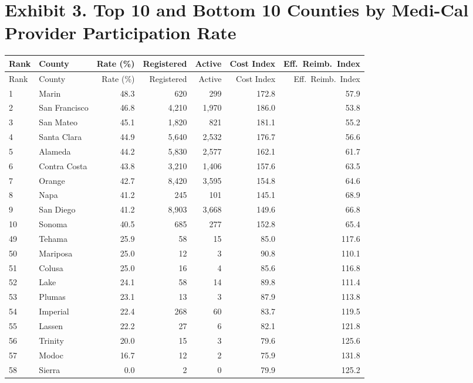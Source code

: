 \documentclass[12pt]{article}
\begin{document}
\newpage
\section*{Exhibit 3. Top 10 and Bottom 10 Counties by Medi-Cal Provider Participation Rate}

\begin{footnotesize}
\begin{longtable}{llrrrrr}
\toprule
Rank & County & Rate (\%) & Registered & Active & Cost Index & Eff.\ Reimb.\ Index \\
\midrule
\endfirsthead
\toprule
Rank & County & Rate (\%) & Registered & Active & Cost Index & Eff.\ Reimb.\ Index \\
\midrule
\endhead
1 & Marin & 48.3 & 620 & 299 & 172.8 & 57.9 \\
2 & San Francisco & 46.8 & 4,210 & 1,970 & 186.0 & 53.8 \\
3 & San Mateo & 45.1 & 1,820 & 821 & 181.1 & 55.2 \\
4 & Santa Clara & 44.9 & 5,640 & 2,532 & 176.7 & 56.6 \\
5 & Alameda & 44.2 & 5,830 & 2,577 & 162.1 & 61.7 \\
6 & Contra Costa & 43.8 & 3,210 & 1,406 & 157.6 & 63.5 \\
7 & Orange & 42.7 & 8,420 & 3,595 & 154.8 & 64.6 \\
8 & Napa & 41.2 & 245 & 101 & 145.1 & 68.9 \\
9 & San Diego & 41.2 & 8,903 & 3,668 & 149.6 & 66.8 \\
10 & Sonoma & 40.5 & 685 & 277 & 152.8 & 65.4 \\
\midrule
49 & Tehama & 25.9 & 58 & 15 & 85.0 & 117.6 \\
50 & Mariposa & 25.0 & 12 & 3 & 90.8 & 110.1 \\
51 & Colusa & 25.0 & 16 & 4 & 85.6 & 116.8 \\
52 & Lake & 24.1 & 58 & 14 & 89.8 & 111.4 \\
53 & Plumas & 23.1 & 13 & 3 & 87.9 & 113.8 \\
54 & Imperial & 22.4 & 268 & 60 & 83.7 & 119.5 \\
55 & Lassen & 22.2 & 27 & 6 & 82.1 & 121.8 \\
56 & Trinity & 20.0 & 15 & 3 & 79.6 & 125.6 \\
57 & Modoc & 16.7 & 12 & 2 & 75.9 & 131.8 \\
58 & Sierra & 0.0 & 2 & 0 & 79.9 & 125.2 \\
\bottomrule
\end{longtable}
\end{footnotesize}
\end{document}

